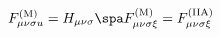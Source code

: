 \begin{equation}
F^{\rm (M)}_{\mu \nu \sigma u} = H_{\mu \nu \sigma}
\spa
F^{\rm (M)}_{\mu \nu \sigma \xi}
= F^{\rm (IIA)}_{\mu \nu \sigma \xi}
\end{equation}

